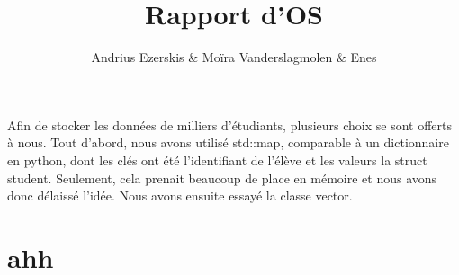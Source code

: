 \documentclass{article}
\title{Rapport d'OS}
\author{Andrius Ezerskis \& Moïra Vanderslagmolen \& Enes}
\begin{document}

Afin de stocker les données de milliers d'étudiants, plusieurs choix se sont offerts à nous. 
Tout d'abord, nous avons utilisé std::map, comparable à un dictionnaire en python, dont les
clés ont été l'identifiant de l'élève et les valeurs la struct student. Seulement, cela
prenait beaucoup de place en mémoire et nous avons donc délaissé l'idée. Nous avons ensuite essayé
la classe vector.


\section{ahh}
\end{document}

